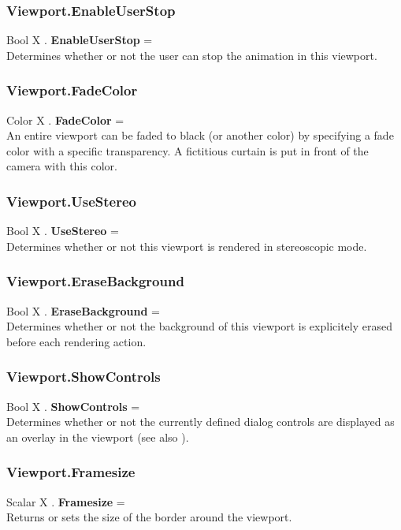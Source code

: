 \subsubsection{Viewport.EnableUserStop \label{F:Viewport:EnableUserStop}}
Bool X . \textbf{EnableUserStop} = \\
Determines whether or not the user can stop the animation in this viewport.

\subsubsection{Viewport.FadeColor \label{F:Viewport:FadeColor}}
Color X . \textbf{FadeColor} = \\
An entire viewport can be faded to black (or another color) by specifying a fade color with a specific transparency. A fictitious curtain is put in front of the camera with this color.

\subsubsection{Viewport.UseStereo \label{F:Viewport:UseStereo}}
Bool X . \textbf{UseStereo} = \\
Determines whether or not this viewport is rendered in stereoscopic mode.

\subsubsection{Viewport.EraseBackground \label{F:Viewport:EraseBackground}}
Bool X . \textbf{EraseBackground} = \\
Determines whether or not the background of this viewport is explicitely erased before each rendering action.

\subsubsection{Viewport.ShowControls \label{F:Viewport:ShowControls}}
Bool X . \textbf{ShowControls} = \\
Determines whether or not the currently defined dialog controls are displayed as an overlay in the viewport (see also ).

\subsubsection{Viewport.Framesize \label{F:Viewport:Framesize}}
Scalar X . \textbf{Framesize} = \\
Returns or sets the size of the border around the viewport.

